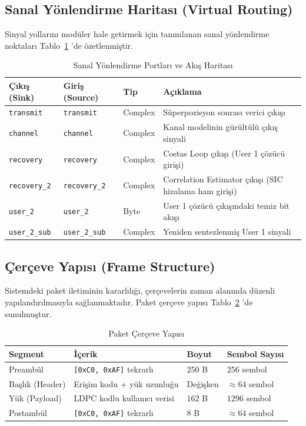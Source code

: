 \subsection{Sanal Yönlendirme Haritası (Virtual Routing)}
Sinyal yollarını modüler hale getirmek için tanımlanan sanal yönlendirme noktaları Tablo~\ref{tab:virtual_routing} 'de özetlenmiştir.

\begin{table}[htbp]
\caption{Sanal Yönlendirme Portları ve Akış Haritası}
\label{tab:virtual_routing}
\centering
\begin{tabular}{lllp{2.8cm}}
\toprule
\textbf{Çıkış (Sink)} & \textbf{Giriş (Source)} & \textbf{Tip} & \textbf{Açıklama} \\
\midrule
\texttt{transmit} & \texttt{transmit} & Complex & Süperpozisyon sonrası verici çıkışı \\
\texttt{channel} & \texttt{channel} & Complex & Kanal modelinin gürültülü çıkış sinyali \\
\texttt{recovery} & \texttt{recovery} & Complex & Costas Loop çıkışı (User 1 çözücü girişi) \\
\texttt{recovery\_2} & \texttt{recovery\_2} & Complex & Correlation Estimator çıkışı (SIC hizalama ham girişi) \\
\texttt{user\_2} & \texttt{user\_2} & Byte & User 1 çözücü çıkışındaki temiz bit akışı \\
\texttt{user\_2\_sub} & \texttt{user\_2\_sub} & Complex & Yeniden sentezlenmiş User 1 sinyali \\
\bottomrule
\end{tabular}
\end{table}

\subsection{Çerçeve Yapısı (Frame Structure)}
Sistemdeki paket iletiminin kararlılığı, çerçevelerin zaman alanında düzenli yapılandırılmasıyla sağlanmaktadır. Paket çerçeve yapısı Tablo~\ref{tab:frame_structure} 'de sunulmuştur.

\begin{table}[htbp]
\caption{Paket Çerçeve Yapısı}
\label{tab:frame_structure}
\centering
\begin{tabular}{llll}
\toprule
\textbf{Segment} & \textbf{İçerik} & \textbf{Boyut} & \textbf{Sembol Sayısı} \\
\midrule
Preambül & \texttt{[0xC0, 0xAF]} tekrarlı & $250$ B & $256$ sembol \\
Başlık (Header) & Erişim kodu + yük uzunluğu & Değişken & $\approx 64$ sembol \\
Yük (Payload) & LDPC kodlu kullanıcı verisi & $162$ B & $1296$ sembol \\
Postambül & \texttt{[0xC0, 0xAF]} tekrarlı & $8$ B & $\approx 64$ sembol \\
\bottomrule
\end{tabular}
\end{table}

